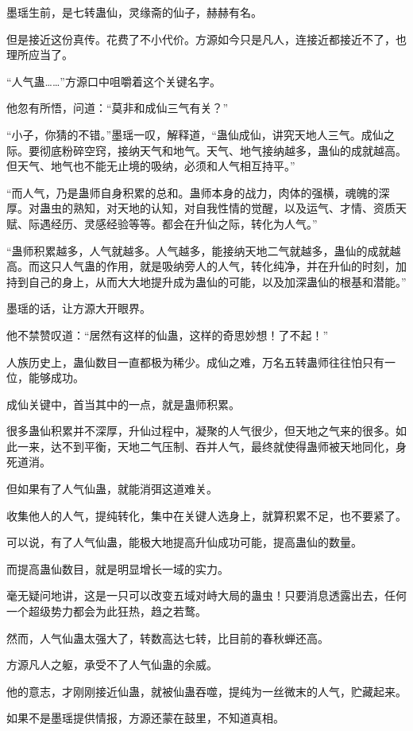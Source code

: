 \begin{this_body}
墨瑶生前，是七转蛊仙，灵缘斋的仙子，赫赫有名。

但是接近这份真传。花费了不小代价。方源如今只是凡人，连接近都接近不了，也理所应当了。

“人气蛊……”方源口中咀嚼着这个关键名字。

他忽有所悟，问道：“莫非和成仙三气有关？”

“小子，你猜的不错。”墨瑶一叹，解释道，“蛊仙成仙，讲究天地人三气。成仙之际。要彻底粉碎空窍，接纳天气和地气。天气、地气接纳越多，蛊仙的成就越高。但天气、地气也不能无止境的吸纳，必须和人气相互持平。”

“而人气，乃是蛊师自身积累的总和。蛊师本身的战力，肉体的强横，魂魄的深厚。对蛊虫的熟知，对天地的认知，对自我性情的觉醒，以及运气、才情、资质天赋、际遇经历、灵感经验等等。都会在升仙之际，转化为人气。”

“蛊师积累越多，人气就越多。人气越多，能接纳天地二气就越多，蛊仙的成就越高。而这只人气蛊的作用，就是吸纳旁人的人气，转化纯净，并在升仙的时刻，加持到自己的身上，从而大大地提升成为蛊仙的可能，以及加深蛊仙的根基和潜能。”

墨瑶的话，让方源大开眼界。

他不禁赞叹道：“居然有这样的仙蛊，这样的奇思妙想！了不起！”

人族历史上，蛊仙数目一直都极为稀少。成仙之难，万名五转蛊师往往怕只有一位，能够成功。

成仙关键中，首当其中的一点，就是蛊师积累。

很多蛊仙积累并不深厚，升仙过程中，凝聚的人气很少，但天地之气来的很多。如此一来，达不到平衡，天地二气压制、吞并人气，最终就使得蛊师被天地同化，身死道消。

但如果有了人气仙蛊，就能消弭这道难关。

收集他人的人气，提纯转化，集中在关键人选身上，就算积累不足，也不要紧了。

可以说，有了人气仙蛊，能极大地提高升仙成功可能，提高蛊仙的数量。

而提高蛊仙数目，就是明显增长一域的实力。

毫无疑问地讲，这是一只可以改变五域对峙大局的蛊虫！只要消息透露出去，任何一个超级势力都会为此狂热，趋之若鹜。

然而，人气仙蛊太强大了，转数高达七转，比目前的春秋蝉还高。

方源凡人之躯，承受不了人气仙蛊的余威。

他的意志，才刚刚接近仙蛊，就被仙蛊吞噬，提纯为一丝微末的人气，贮藏起来。

如果不是墨瑶提供情报，方源还蒙在鼓里，不知道真相。


\end{this_body}
